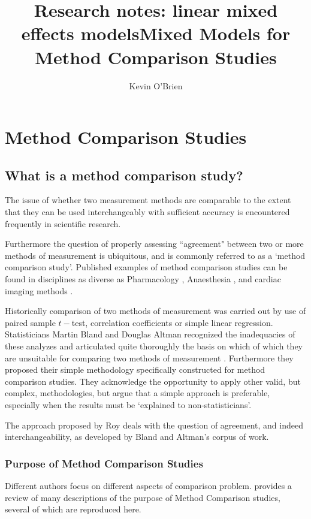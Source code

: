\documentclass[12pt, a4paper]{report}
\title{Research notes: linear mixed effects models}
\author{ } \date{ }
\theoremstyle{plain}
\theoremstyle{definition}
\theoremstyle{remark}
\begin{document}
	\author{Kevin O'Brien}
	\title{Mixed Models for Method Comparison Studies}
	\tableofcontents
	
	\newpage
	\chapter{Method Comparison Studies}
	
	
	\section{What is a method comparison study?}
The issue of whether two measurement methods are comparable to the extent that they can be used interchangeably with sufficient accuracy is encountered frequently in scientific research.

Furthermore the question of properly assessing ``agreement" between two or more methods of measurement is ubiquitous, and is commonly referred to as a `method comparison study'. Published examples of method comparison studies can be found in disciplines
as diverse as Pharmacology \citep{ludbrook97}, Anaesthesia \citep{Myles}, and cardiac imaging methods \citep{Krumm}.
	
Historically comparison of two methods of measurement was carried out by use of paired sample $t-$test, correlation coefficients or simple linear regression. Statisticians Martin Bland and Douglas Altman recognized the inadequacies of these analyzes and
articulated quite thoroughly the basis on which of which they are unsuitable for comparing two methods of measurement \citep*{BA83}. Furthermore they proposed their simple methodology specifically constructed for method comparison studies. They acknowledge the opportunity to apply other valid, but complex, methodologies, but argue that a simple approach is preferable, especially when the
results must be `explained to non-statisticians'.

 The approach proposed by Roy deals with the question of agreement, and indeed interchangeability, as developed by Bland and Altman's corpus of work.

	\subsection{Purpose of Method Comparison Studies}
	Different authors focus on different aspects of comparison problem. \citet{BXC2010} provides a review of many descriptions of the purpose of Method Comparison studies, several of which are reproduced here.
	
\end{document}

